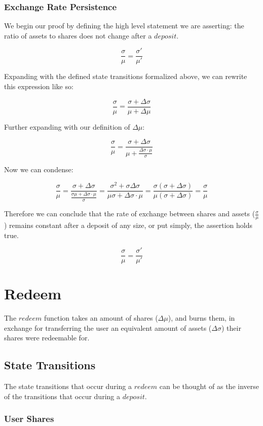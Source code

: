 \documentclass{article}
\begin{document}
\subsubsection{Exchange Rate Persistence}

We begin our proof by defining the high level statement we are asserting: the ratio of assets to shares does not change after a $deposit$.

$$ \frac{\sigma}{\mu} = \frac{\sigma'}{\mu'} $$

Expanding with the defined state transitions formalized above, we can rewrite this expression like so:

$$ \frac{\sigma}{\mu} = \frac{\sigma + \Delta\sigma}{\mu + \Delta\mu} $$

Further expanding with our definition of $\Delta\mu$:

$$ \frac{\sigma}{\mu} = \frac{\sigma + \Delta\sigma}{\mu + \frac{\Delta\sigma \cdot \mu}{\sigma}} $$

Now we can condense:

$$ \frac{\sigma}{\mu} = \frac{\sigma + \Delta\sigma}{\frac{\sigma\mu + \Delta\sigma \cdot \mu}{\sigma}} = \frac{\sigma^{2} + \sigma\Delta\sigma}{\mu\sigma + \Delta\sigma \cdot \mu} = \frac{\sigma(\sigma + \Delta\sigma)}{\mu(\sigma + \Delta\sigma)} = \frac{\sigma}{\mu} $$

Therefore we can conclude that the rate of exchange between shares and assets ($\frac{\sigma}{\mu}$) remains constant after a deposit of any size, or put simply, the assertion holds true.

$$ \frac{\sigma}{\mu} = \frac{\sigma'}{\mu'} $$

\section{Redeem}

The $redeem$ function takes an amount of shares ($
\Delta\mu$), and burns them, in exchange for transferring the user an equivalent amount of assets ($\Delta\sigma$) their shares were redeemable for.

\subsection{State Transitions}

The state transitions that occur during a $redeem$ can be thought of as the inverse of the transitions that occur during a $deposit$.

\subsubsection{User Shares}
\end{document}
